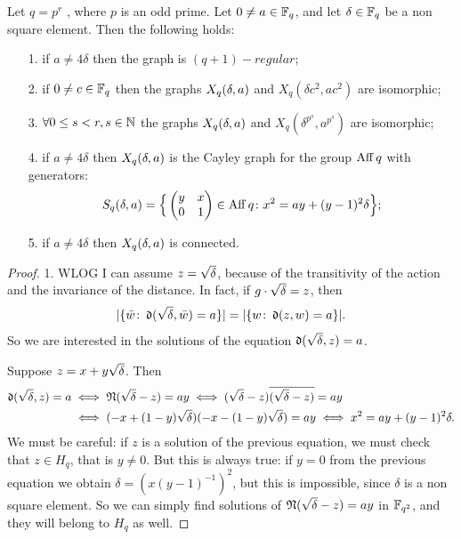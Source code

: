 \begin{theorem}\label{important}
Let $q=p^r$ , where $p$ is an odd prime. Let $0\neq a\in {\mathbb F}_q$, and let $\delta \in {\mathbb F}_q$ be a non square element.
Then the following holds:
\begin{itemize}
\item[1.] if $a\neq 4\delta$ then the graph is $(q+1)-regular$;
\item[2.] if $0\neq c\in {\mathbb F}_q$ then the graphs $X_q (\delta ,a)$ and $X_q(\delta c^2, a c^2)$ are isomorphic;  
\item[3.] $\forall 0 \leq s < r, s\in {\mathbb N}$ the graphs $X_q (\delta ,a)$ and $X_q (\delta^{p^s}, a^{p^s})$ are isomorphic;
\item[4.] if $a\neq 4\delta$ then $X_q (\delta ,a)$ is the Cayley graph for the group $\operatorname{Aff} q$ with generators:
\begin{equation}\label{generators}
	S_q(\delta,a) = \Big\{ \begin{pmatrix} y & x \\ 0 & 1 \end{pmatrix} \in \operatorname{Aff} q \colon x^2=ay+(y-1)^2 \delta \Big\};
\end{equation}
\item[5.] if $a\neq 4\delta$ then $X_q (\delta ,a)$ is connected.
\end{itemize}
\begin{proof}
1. WLOG I can assume $z=\sqrt{\delta}$, because of the transitivity of the action and the invariance of the distance.
In fact, if $g \cdot \sqrt{\delta} = z$, then 
\begin{equation*}
\lvert \{\bar{w} \colon \operatorname{\mathfrak{d}} (\sqrt{\delta}, \bar{w})=a\}\rvert=\lvert \{w \colon \operatorname{\mathfrak{d}} (z,w)=a \} \rvert.
\end{equation*}
So we are interested in the solutions of the equation $\operatorname{\mathfrak{d}} (\sqrt{\delta}, z)=a$.

Suppose $z=x+y\sqrt{\delta}$. Then
\begin{align} \label{distance}
	\operatorname{\mathfrak{d}} (\sqrt{\delta}, z)=a & \iff \operatorname{\mathfrak{N}} (\sqrt{\delta} - z) = ay
					  \iff (\sqrt{\delta} - z)\overline{(\sqrt{\delta} - z)}=ay\\ \notag
					 & \iff (-x+(1-y)\sqrt{\delta})(-x-(1-y)\sqrt{\delta} )=ay
					  \iff x^2 = ay + (y-1)^2 \delta. \notag
\end{align}
We must be careful: if $z$ is a solution of the previous equation, we must check that $z\in H_q$, that is $y\neq 0$.
But this is always true: if $y=0$ from the previous equation we obtain $\delta=(x(y-1)^{-1})^2$,
but this is impossible, since $\delta$ is a non square element.
So we can simply find solutions of $\operatorname{\mathfrak{N}} (\sqrt{\delta} - z) = ay$ in ${\mathbb F}_{q^2}$, and they will belong to $H_q$ as well.


\end{proof}
\end{theorem}
